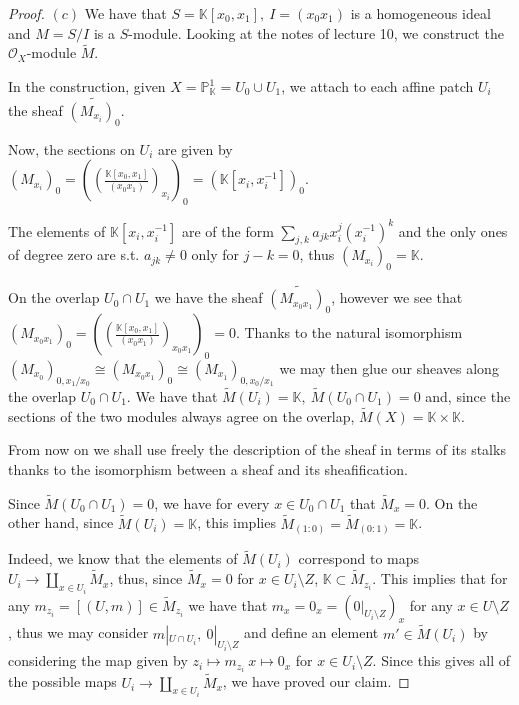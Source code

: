\documentclass{article}
\newcommand{\numberset}{\mathbb}
\newcommand{\K}{\numberset{K}}
\newcommand{\Ps}{\mathbb{P}}
\begin{document}
\begin{proof}
    $(c)$ We have that $S=\K[x_0,x_1],\ I=(x_0x_1)$ is a homogeneous ideal and
    $M=S/I$ is a $S$-module. Looking at the notes of lecture 10, we construct
    the $\mathcal{O}_X$-module $\tilde{M}$.

    In the construction, given $X=\Ps^1_\K=U_0\cup U_1$, we attach to each
    affine patch $U_i$ the sheaf $\widetilde{(M_{x_i})_0}$.

    Now, the sections on $U_i$ are given by $(M_{x_i})_0=\left( \left(
    \frac{\K[x_0,x_1]}{(x_0x_1)} \right)_{x_i}\right)_0=(\K[x_i,x_i^{-1}])_0$.

    The elements of $\K[x_i,x_i^{-1}]$ are of the form
    $\sum_{j,k}a_{jk}x_i^j(x_i^{-1})^k$ and the only ones of degree zero are
    s.t. $a_{jk}\neq 0$ only for $j-k=0$, thus $(M_{x_i})_0=\K$.

    On the overlap $U_0\cap U_1$ we have the sheaf
    $\widetilde{(M_{x_0x_1})_0}$, however we see that $(M_{x_0x_1})_0=\left(
    \left(\frac{\K[x_0,x_1]}{(x_0x_1)} \right)_{x_0x_1}\right)_0=0$. Thanks to
    the natural isomorphism
    $(M_{x_0})_{0,x_1/x_0}\cong(M_{x_0x_1})_0\cong(M_{x_1})_{0,x_0/x_1}$ we may
    then glue our sheaves along the overlap $U_0\cap U_1$. We have that
    $\tilde{M}(U_i)=\K,\ \tilde{M}(U_0\cap U_1)=0$ and, since the sections of
    the two modules always agree on the overlap, $\tilde{M}(X)=\K\times\K$.
    
    From now on we shall use freely the description of the sheaf in terms of its
    stalks thanks to the isomorphism between a sheaf and its sheafification.

    Since $ \tilde{M}(U_0\cap U_1)=0$, we have for every $x\in U_0\cap U_1$ that
    $\tilde{M}_x=0$. On the other hand, since $\tilde{M}(U_i)=\K$, this implies
    $\tilde{M}_{(1:0)}=\tilde{M}_{(0:1)}=\K$.

    Indeed, we know that the elements of $\tilde{M}(U_i)$ correspond to maps
    $U_i\rightarrow\amalg_{x\in U_i}\tilde{M}_x$, thus, since $\tilde{M}_x=0$
    for $x\in U_i\setminus Z$, $\K\subset\tilde{M}_{z_i}$. This implies that for
    any $m_{z_i}=[(U,m)]\in\tilde{M}_{z_i}$ we have that
    $m_x=0_x=(0|_{U_i\setminus Z})_x$ for any $x\in U\setminus Z$, thus we may
    consider $m|_{U\cap U_i},\ 0|_{U_i\setminus Z}$ and
    define an element $m'\in\tilde{M}(U_i)$ by considering the map given by
    $z_i\mapsto m_{z_i}\ x\mapsto 0_x$ for $x\in U_i\setminus Z$. Since this
    gives all of the possible maps $U_i\rightarrow\amalg_{x\in U_i}\tilde{M}_x$,
    we have proved our claim.
    

\end{proof}
\end{document}
